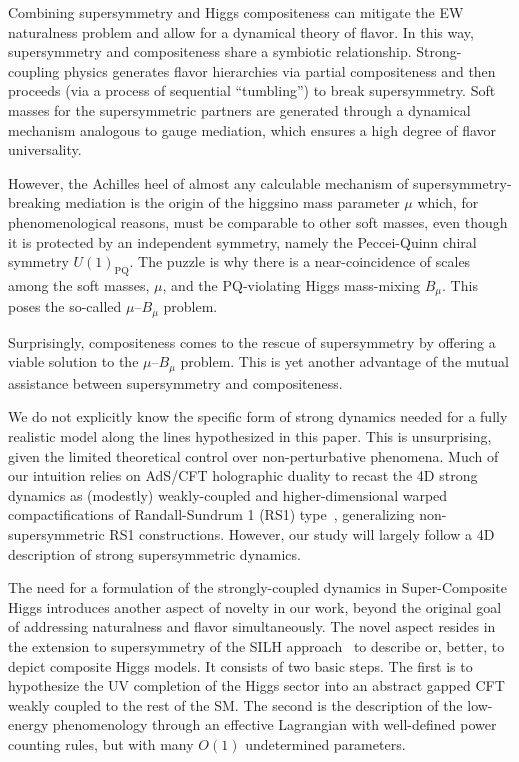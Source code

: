 \documentclass[a4paper,12pt]{article}
\begin{document}
Combining supersymmetry and Higgs compositeness can mitigate the EW naturalness problem and allow for a dynamical theory of flavor. In this way, supersymmetry and compositeness share a symbiotic relationship. Strong-coupling physics generates flavor hierarchies via partial compositeness and then proceeds (via a process of sequential ``tumbling'') to break supersymmetry. Soft masses for the supersymmetric partners are generated through a dynamical mechanism analogous to gauge mediation, which ensures a high degree of flavor universality. 

However, the Achilles heel of almost any calculable mechanism of supersymmetry-breaking mediation is the origin of the higgsino mass parameter $\mu$ which, for phenomenological reasons, must be comparable to other soft masses, even though it is protected by an independent symmetry, namely the Peccei-Quinn chiral symmetry $U(1)_{\textrm{PQ}}$. The puzzle is why there is a near-coincidence of scales among the soft masses, $\mu$, and the PQ-violating Higgs mass-mixing $B_{\mu}$. This poses the so-called $\mu$--$B_\mu$ problem. 

Surprisingly, compositeness comes to the rescue of supersymmetry by offering a viable solution to the $\mu$--$B_\mu$ problem. This is yet another advantage of the mutual assistance between supersymmetry and compositeness.

We do not explicitly know the specific form of strong dynamics needed for a fully realistic model along the lines hypothesized in this paper. This is unsurprising, given the limited theoretical control over non-perturbative phenomena. Much of our intuition relies on AdS/CFT holographic duality to recast the 4D strong dynamics as  (modestly) weakly-coupled and higher-dimensional warped compactifications of Randall-Sundrum 1 (RS1) type~\cite{Randall:1999ee}, generalizing non-supersymmetric RS1 constructions. However, our study will largely follow a 4D description of strong supersymmetric dynamics. 

The need for a formulation of the strongly-coupled dynamics in Super-Composite Higgs introduces another aspect of novelty in our work, beyond the original goal of addressing naturalness and flavor simultaneously. The novel aspect resides in the extension to supersymmetry of the SILH approach~\cite{Giudice:2007fh} to describe or, better, to depict composite Higgs models. It consists of two basic steps. The first is to hypothesize the UV completion of the Higgs sector into an abstract  gapped CFT weakly coupled to the rest of the SM. The second is the description of the low-energy phenomenology through an effective Lagrangian with well-defined power counting rules, but with many $O(1)$ undetermined parameters. 
\end{document}
